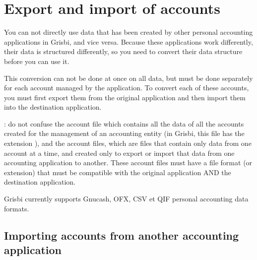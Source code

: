 

\chapter{Export and import of accounts\label{move}}

You can not directly use data that has been created by other personal accounting applications in Grisbi, and vice versa. Because these applications work differently, their data is structured differently, so you need to convert their data structure before you can use it. 

This conversion can not be done at once on all data, but must be done separately for each account managed by the application. To convert each of these accounts, you must first \og export \fg{}them from the original application and then \og import \fg{} them into the destination application.


 :  do not confuse the \og account file \fg{}which contains all the data of all the accounts created for the management of an accounting entity (in Grisbi, this file has the \gls{extension} ), and the \og account files\fg{}, which are files that contain only data from one account at a time, and created only to export or import that data from one accounting application to another. These \og account files  \fg{}  must have a  \gls{file format} (or extension) that must be compatible with the original application AND the destination application.

Grisbi currently supports \gls{Gnucash}, \gls{OFX}, \gls{CSV} et \gls{QIF} personal accounting data formats.

\section{Importing accounts from another accounting application\label{move-import}}

